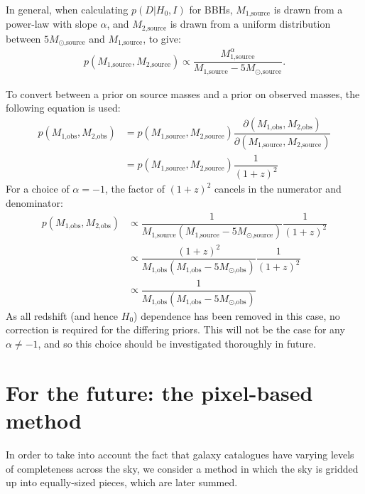 \documentclass[a4paper,10pt]{article}
\begin{document}
In general, when calculating $p(D|H_0,I)$ for BBHs, $M_{\text{1,source}}$ is drawn from a power-law with slope $\alpha$, and $M_{\text{2,source}}$ is drawn from a uniform distribution between $5M_{\odot\text{,source}}$ and $M_{\text{1,source}}$, to give:
\begin{equation}
\begin{aligned}
p(M_{\text{1,source}},M_{\text{2,source}}) \propto \dfrac{M_{\text{1,source}}^\alpha}{M_{\text{1,source}}-5M_{\odot\text{,source}}}.
\end{aligned}
\end{equation}

To convert between a prior on source masses and a prior on observed masses, the following equation is used:
\begin{equation}
\begin{aligned}
p(M_{\text{1,obs}},M_{\text{2,obs}}) &= p(M_{\text{1,source}},M_{\text{2,source}}) \dfrac{\partial(M_{\text{1,obs}},M_{\text{2,obs}})}{\partial(M_{\text{1,source}},M_{\text{2,source}})}
\\ &= p(M_{\text{1,source}},M_{\text{2,source}}) \dfrac{1}{(1+z)^2}
\end{aligned}
\end{equation}
For a choice of $\alpha=-1$, the factor of $(1+z)^2$ cancels in the numerator and denominator:
\begin{equation}
\begin{aligned}
p(M_{\text{1,obs}},M_{\text{2,obs}}) &\propto \dfrac{1}{M_{\text{1,source}}(M_{\text{1,source}}-5M_{\odot\text{,source}})} \dfrac{1}{(1+z)^2}
\\ &\propto \dfrac{(1+z)^2}{M_{\text{1,obs}}(M_{\text{1,obs}}-5M_{\odot\text{,obs}})} \dfrac{1}{(1+z)^2}
\\ &\propto \dfrac{1}{M_{\text{1,obs}}(M_{\text{1,obs}}-5M_{\odot\text{,obs}})}
\end{aligned}
\end{equation}
As all redshift (and hence $H_0$) dependence has been removed in this case, no correction is required for the differing priors.  This will not be the case for any $\alpha \neq -1$, and so this choice should be investigated thoroughly in future.


\section{For the future: the pixel-based method \label{Sec: Future}}
In order to take into account the fact that galaxy catalogues have varying levels of completeness across the sky, we consider a method in which the sky is gridded up into equally-sized pieces, which are later summed.
\end{document}
